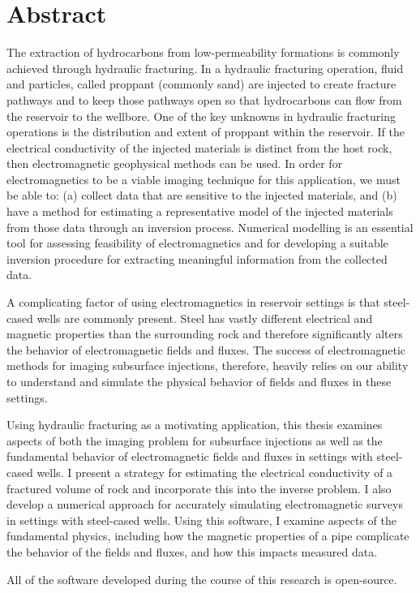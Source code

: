 
\chapter{Abstract}

The extraction of hydrocarbons from low-permeability formations is commonly achieved through hydraulic fracturing. In a hydraulic fracturing operation, fluid and particles, called proppant (commonly sand) are injected to create fracture pathways and to keep those pathways open so that hydrocarbons can flow from the reservoir to the wellbore. One of the key unknowns in hydraulic fracturing operations is the distribution and extent of proppant within the reservoir. If the electrical conductivity of the injected materials is distinct from the host rock, then electromagnetic geophysical methods can be used. In order for electromagnetics to be a viable imaging technique for this application, we must be able to: (a) collect data that are sensitive to the injected materials, and (b) have a method for estimating a representative model of the injected materials from those data through an inversion process. Numerical modelling is an essential tool for assessing feasibility of electromagnetics and for developing a suitable inversion procedure for extracting meaningful information from the collected data.

A complicating factor of using electromagnetics in reservoir settings is that steel-cased wells are commonly present. Steel has vastly different electrical and magnetic properties than the surrounding rock and therefore significantly alters the behavior of electromagnetic fields and fluxes. The success of electromagnetic methods for imaging subsurface injections, therefore, heavily relies on our ability to understand and simulate the physical behavior of fields and fluxes in these settings.

Using hydraulic fracturing as a motivating application, this thesis examines aspects of both the imaging problem for subsurface injections as well as the fundamental behavior of electromagnetic fields and fluxes in settings with steel-cased wells. I present a strategy for estimating the electrical conductivity of a fractured volume of rock and incorporate this into the inverse problem. I also develop a numerical approach for accurately simulating electromagnetic surveys in settings with steel-cased wells. Using this software, I examine aspects of the fundamental physics, including how the magnetic properties of a pipe complicate the behavior of the fields and fluxes, and how this impacts measured data.

All of the software developed during the course of this research is open-source.

